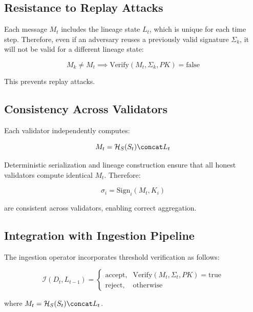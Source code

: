 \subsection{Resistance to Replay Attacks}

Each message $M_t$ includes the lineage state $L_t$, which is unique for each time step. Therefore, even if an adversary reuses a previously valid signature $\Sigma_k$, it will not be valid for a different lineage state:

\begin{equation}
M_k \neq M_t \implies \text{Verify}(M_t, \Sigma_k, PK) = \text{false}
\end{equation}

This prevents replay attacks.

\subsection{Consistency Across Validators}

Each validator independently computes:

\begin{equation}
M_t = \mathcal{H}_S(S_t) \concat L_t
\end{equation}

Deterministic serialization and lineage construction ensure that all honest validators compute identical $M_t$. Therefore:

\begin{equation}
\sigma_i = \text{Sign}_i(M_t, K_i)
\end{equation}

are consistent across validators, enabling correct aggregation.

\subsection{Integration with Ingestion Pipeline}

The ingestion operator incorporates threshold verification as follows:

\begin{equation}
\mathcal{I}(D_t, L_{t-1}) =
\begin{cases}
\text{accept}, & \text{Verify}(M_t, \Sigma_t, PK) = \text{true} \\
\text{reject}, & \text{otherwise}
\end{cases}
\end{equation}

where $M_t = \mathcal{H}_S(S_t) \concat L_t$.


